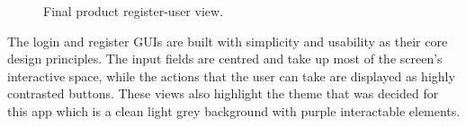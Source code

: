 \begin{figure}
\begin{minipage}{.5\textwidth}
      \caption{Final product register-user view.}
      \label{fig:result_register}
    \end{minipage}
\end{figure}

The login and register GUIs are built with simplicity and usability as their core design principles. The input fields are centred and take up most of the screen's interactive space, while the actions that the user can take are displayed as highly contrasted buttons. These views also highlight the theme that was decided for this app which is a clean light grey background with purple interactable elements. 

